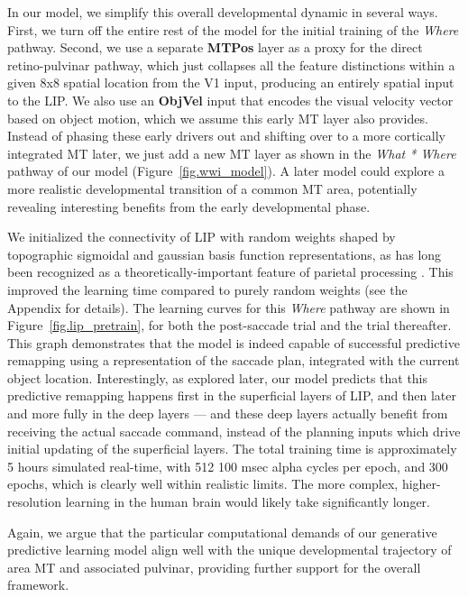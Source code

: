 \documentclass[11pt,twoside]{article}
\newif\myifpdf
\begin{document}
In our model, we simplify this overall developmental dynamic in several ways.  First, we turn off the entire rest of the model for the initial training of the {\em Where} pathway.  Second, we use a separate {\bf MTPos} layer as a proxy for the direct retino-pulvinar pathway, which just collapses all the feature distinctions within a given 8x8 spatial location from the V1 input, producing an entirely spatial input to the LIP.  We also use an {\bf ObjVel} input that encodes the visual velocity vector based on object motion, which we assume this early MT layer also provides.  Instead of phasing these early drivers out and shifting over to a more cortically integrated MT later, we just add a new MT layer as shown in the {\em What * Where} pathway of our model (Figure~\ref{fig.wwi_model}).  A later model could explore a more realistic developmental transition of a common MT area, potentially revealing interesting benefits from the early developmental phase.

We initialized the connectivity of LIP with random weights shaped by topographic sigmoidal and gaussian basis function representations, as has long been recognized as a theoretically-important feature of parietal processing \cite{ZipserAndersen88,PougetSejnowski97}.  This improved the learning time compared to purely random weights (see the Appendix for details).  The learning curves for this {\em Where} pathway are shown in Figure~\ref{fig.lip_pretrain}, for both the post-saccade trial and the trial thereafter.  This graph demonstrates that the model is indeed capable of successful predictive remapping using a representation of the saccade plan, integrated with the current object location.  Interestingly, as explored later, our model predicts that this predictive remapping happens first in the superficial layers of LIP, and then later and more fully in the deep layers --- and these deep layers actually benefit from receiving the actual saccade command, instead of the planning inputs which drive initial updating of the superficial layers.  The total training time is approximately 5 hours simulated real-time, with 512 100 msec alpha cycles per epoch, and 300 epochs, which is clearly well within realistic limits.  The more complex, higher-resolution learning in the human brain would likely take significantly longer.

Again, we argue that the particular computational demands of our generative predictive learning model align well with the unique developmental trajectory of area MT and associated pulvinar, providing further support for the overall framework.
\end{document}

